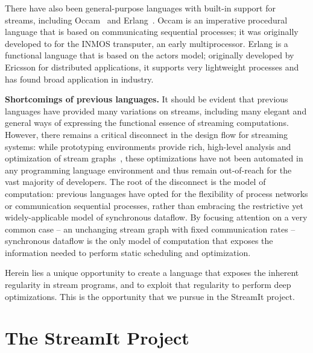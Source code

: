 There have also been general-purpose languages with built-in support
for streams, including Occam~\cite{occammanual} and
Erlang~\cite{armstrong_concurrent_1993}.  Occam is an imperative
procedural language that is based on communicating sequential
processes; it was originally developed to for the INMOS transputer, an
early multiprocessor.  Erlang is a functional language that is based
on the actors model; originally developed by Ericsson for distributed
applications, it supports very lightweight processes and has found
broad application in industry.

{\bf Shortcomings of previous languages.}  It should be evident that
previous languages have provided many variations on streams, including
many elegant and general ways of expressing the functional essence of
streaming computations.  However, there remains a critical disconnect
in the design flow for streaming systems: while prototyping
environments provide rich, high-level analysis and optimization of
stream graphs~\cite{TODO}, these optimizations have not been automated
in any programming language environment and thus remain out-of-reach
for the vast majority of developers.  The root of the disconnect is
the model of computation: previous languages have opted for the
flexibility of process networks or communication sequential processes,
rather than embracing the restrictive yet widely-applicable model of
synchronous dataflow.  By focusing attention on a very common case --
an unchanging stream graph with fixed communication rates --
synchronous dataflow is the only model of computation that exposes the
information needed to perform static scheduling and optimization.

Herein lies a unique opportunity to create a language that exposes the
inherent regularity in stream programs, and to exploit that regularity
to perform deep optimizations.  This is the opportunity that we pursue
in the StreamIt project.


\section{The StreamIt Project}

